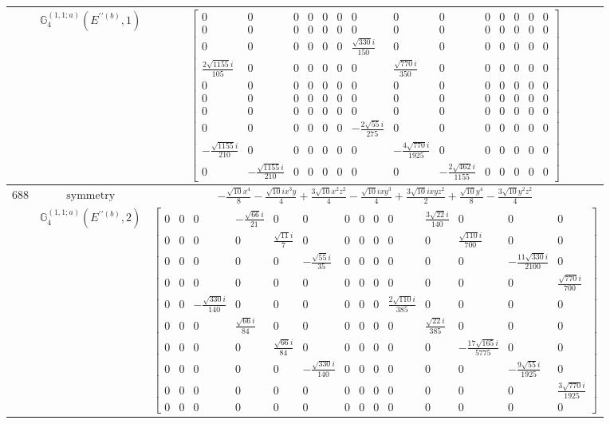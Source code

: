 \documentclass[fleqn,8pt,landscape]{jsarticle}
\begin{document}
\begin{longtable}{ccc}
$  $ & $ \mathbb{G}_{4}^{(1,1;a)}(E^{\prime\prime(b)},1) $ & $ \begin{bmatrix} 0 & 0 & 0 & 0 & 0 & 0 & 0 & 0 & 0 & 0 & 0 & 0 & 0 & 0 \\ 0 & 0 & 0 & 0 & 0 & 0 & 0 & 0 & 0 & 0 & 0 & 0 & 0 & 0 \\ 0 & 0 & 0 & 0 & 0 & 0 & \frac{\sqrt{330} i}{150} & 0 & 0 & 0 & 0 & 0 & 0 & 0 \\ \frac{2 \sqrt{1155} i}{105} & 0 & 0 & 0 & 0 & 0 & 0 & \frac{\sqrt{770} i}{350} & 0 & 0 & 0 & 0 & 0 & 0 \\ 0 & 0 & 0 & 0 & 0 & 0 & 0 & 0 & 0 & 0 & 0 & 0 & 0 & 0 \\ 0 & 0 & 0 & 0 & 0 & 0 & 0 & 0 & 0 & 0 & 0 & 0 & 0 & 0 \\ 0 & 0 & 0 & 0 & 0 & 0 & 0 & 0 & 0 & 0 & 0 & 0 & 0 & 0 \\ 0 & 0 & 0 & 0 & 0 & 0 & - \frac{2 \sqrt{55} i}{275} & 0 & 0 & 0 & 0 & 0 & 0 & 0 \\ - \frac{\sqrt{1155} i}{210} & 0 & 0 & 0 & 0 & 0 & 0 & - \frac{4 \sqrt{770} i}{1925} & 0 & 0 & 0 & 0 & 0 & 0 \\ 0 & - \frac{\sqrt{1155} i}{210} & 0 & 0 & 0 & 0 & 0 & 0 & - \frac{2 \sqrt{462} i}{1155} & 0 & 0 & 0 & 0 & 0 \end{bmatrix} $ \\ \hline
$ 688 $ & $ \text{symmetry} $ & $ - \frac{\sqrt{10} x^{4}}{8} - \frac{\sqrt{10} i x^{3} y}{4} + \frac{3 \sqrt{10} x^{2} z^{2}}{4} - \frac{\sqrt{10} i x y^{3}}{4} + \frac{3 \sqrt{10} i x y z^{2}}{2} + \frac{\sqrt{10} y^{4}}{8} - \frac{3 \sqrt{10} y^{2} z^{2}}{4} $ \\
$  $ & $ \mathbb{G}_{4}^{(1,1;a)}(E^{\prime\prime(b)},2) $ & $ \begin{bmatrix} 0 & 0 & 0 & - \frac{\sqrt{66} i}{21} & 0 & 0 & 0 & 0 & 0 & 0 & \frac{3 \sqrt{22} i}{140} & 0 & 0 & 0 \\ 0 & 0 & 0 & 0 & \frac{\sqrt{11} i}{7} & 0 & 0 & 0 & 0 & 0 & 0 & \frac{\sqrt{110} i}{700} & 0 & 0 \\ 0 & 0 & 0 & 0 & 0 & - \frac{\sqrt{55} i}{35} & 0 & 0 & 0 & 0 & 0 & 0 & - \frac{11 \sqrt{330} i}{2100} & 0 \\ 0 & 0 & 0 & 0 & 0 & 0 & 0 & 0 & 0 & 0 & 0 & 0 & 0 & \frac{\sqrt{770} i}{700} \\ 0 & 0 & - \frac{\sqrt{330} i}{140} & 0 & 0 & 0 & 0 & 0 & 0 & \frac{2 \sqrt{110} i}{385} & 0 & 0 & 0 & 0 \\ 0 & 0 & 0 & \frac{\sqrt{66} i}{84} & 0 & 0 & 0 & 0 & 0 & 0 & \frac{\sqrt{22} i}{385} & 0 & 0 & 0 \\ 0 & 0 & 0 & 0 & \frac{\sqrt{66} i}{84} & 0 & 0 & 0 & 0 & 0 & 0 & - \frac{17 \sqrt{165} i}{5775} & 0 & 0 \\ 0 & 0 & 0 & 0 & 0 & - \frac{\sqrt{330} i}{140} & 0 & 0 & 0 & 0 & 0 & 0 & - \frac{9 \sqrt{55} i}{1925} & 0 \\ 0 & 0 & 0 & 0 & 0 & 0 & 0 & 0 & 0 & 0 & 0 & 0 & 0 & \frac{3 \sqrt{770} i}{1925} \\ 0 & 0 & 0 & 0 & 0 & 0 & 0 & 0 & 0 & 0 & 0 & 0 & 0 & 0 \end{bmatrix} $ \\ \hline

\end{longtable}
\end{document}
